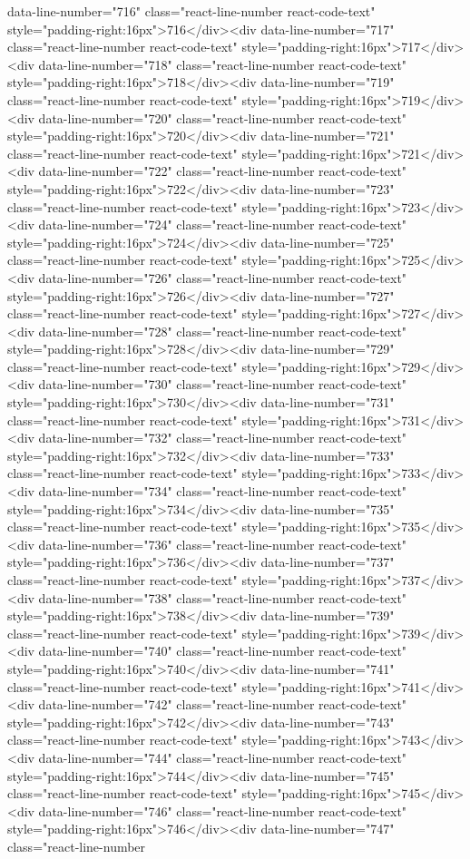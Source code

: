 data-line-number="716" class="react-line-number react-code-text" style="padding-right:16px">716</div><div data-line-number="717" class="react-line-number react-code-text" style="padding-right:16px">717</div><div data-line-number="718" class="react-line-number react-code-text" style="padding-right:16px">718</div><div data-line-number="719" class="react-line-number react-code-text" style="padding-right:16px">719</div><div data-line-number="720" class="react-line-number react-code-text" style="padding-right:16px">720</div><div data-line-number="721" class="react-line-number react-code-text" style="padding-right:16px">721</div><div data-line-number="722" class="react-line-number react-code-text" style="padding-right:16px">722</div><div data-line-number="723" class="react-line-number react-code-text" style="padding-right:16px">723</div><div data-line-number="724" class="react-line-number react-code-text" style="padding-right:16px">724</div><div data-line-number="725" class="react-line-number react-code-text" style="padding-right:16px">725</div><div data-line-number="726" class="react-line-number react-code-text" style="padding-right:16px">726</div><div data-line-number="727" class="react-line-number react-code-text" style="padding-right:16px">727</div><div data-line-number="728" class="react-line-number react-code-text" style="padding-right:16px">728</div><div data-line-number="729" class="react-line-number react-code-text" style="padding-right:16px">729</div><div data-line-number="730" class="react-line-number react-code-text" style="padding-right:16px">730</div><div data-line-number="731" class="react-line-number react-code-text" style="padding-right:16px">731</div><div data-line-number="732" class="react-line-number react-code-text" style="padding-right:16px">732</div><div data-line-number="733" class="react-line-number react-code-text" style="padding-right:16px">733</div><div data-line-number="734" class="react-line-number react-code-text" style="padding-right:16px">734</div><div data-line-number="735" class="react-line-number react-code-text" style="padding-right:16px">735</div><div data-line-number="736" class="react-line-number react-code-text" style="padding-right:16px">736</div><div data-line-number="737" class="react-line-number react-code-text" style="padding-right:16px">737</div><div data-line-number="738" class="react-line-number react-code-text" style="padding-right:16px">738</div><div data-line-number="739" class="react-line-number react-code-text" style="padding-right:16px">739</div><div data-line-number="740" class="react-line-number react-code-text" style="padding-right:16px">740</div><div data-line-number="741" class="react-line-number react-code-text" style="padding-right:16px">741</div><div data-line-number="742" class="react-line-number react-code-text" style="padding-right:16px">742</div><div data-line-number="743" class="react-line-number react-code-text" style="padding-right:16px">743</div><div data-line-number="744" class="react-line-number react-code-text" style="padding-right:16px">744</div><div data-line-number="745" class="react-line-number react-code-text" style="padding-right:16px">745</div><div data-line-number="746" class="react-line-number react-code-text" style="padding-right:16px">746</div><div data-line-number="747" class="react-line-number 